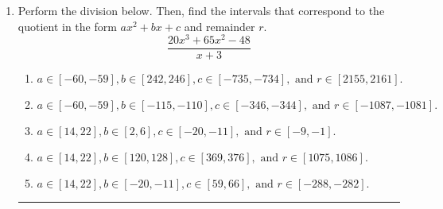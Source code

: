 \documentclass[14pt]{extbook}
\newcommand{\litem}[1]{\item#1\hspace*{-1cm}\rule{\textwidth}{0.4pt}}
\begin{document}
\begin{enumerate}
{\begin{enumerate}[label=\Alph*.]
\end{enumerate} }
\litem{
Perform the division below. Then, find the intervals that correspond to the quotient in the form $ax^2+bx+c$ and remainder $r$.\[ \frac{20x^{3} +65 x^{2} -48}{x + 3} \]\begin{enumerate}[label=\Alph*.]
\item \( a \in [-60, -59], b \in [242, 246], c \in [-735, -734], \text{ and } r \in [2155, 2161]. \)
\item \( a \in [-60, -59], b \in [-115, -110], c \in [-346, -344], \text{ and } r \in [-1087, -1081]. \)
\item \( a \in [14, 22], b \in [2, 6], c \in [-20, -11], \text{ and } r \in [-9, -1]. \)
\item \( a \in [14, 22], b \in [120, 128], c \in [369, 376], \text{ and } r \in [1075, 1086]. \)
\item \( a \in [14, 22], b \in [-20, -11], c \in [59, 66], \text{ and } r \in [-288, -282]. \)

\end{enumerate} }
\end{enumerate}
\end{document}
